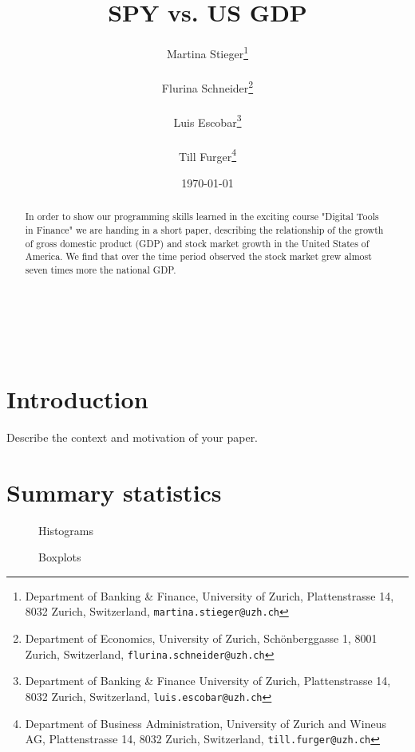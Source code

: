 \documentclass{article}
\title{SPY vs. US GDP}
\author{
    
    Martina Stieger\thanks{Department of Banking \& Finance, University of Zurich, Plattenstrasse 14, 8032 Zurich, Switzerland, \tt{martina.stieger@uzh.ch}} \rule{0.5in}{0pt}

    Flurina Schneider\thanks{Department of Economics, University of Zurich, Schönberggasse 1, 8001 Zurich, Switzerland, \tt{flurina.schneider@uzh.ch}} \rule{0.5in}{0pt}
        
    Luis Escobar\thanks{Department of Banking \& Finance University of Zurich, Plattenstrasse 14, 8032 Zurich, Switzerland, \tt{luis.escobar@uzh.ch}} \rule{0.5in}{0pt}
    
    Till Furger\thanks{Department of Business Administration, University of Zurich and Wineus AG, Plattenstrasse 14, 8032 Zurich, Switzerland, \tt{till.furger@uzh.ch}}\\
    
    \small \date{\today}
}
\begin{document}

\maketitle

\begin{abstract} 
\noindent In order to show our programming skills learned in the exciting course "Digital Tools in Finance" we are
	handing in a short paper, describing the relationship of the growth of gross domestic product (GDP) and stock
	market growth in the United States of America. We find that over the time period observed the stock market grew
	almost seven times more the national GDP.
\end{abstract}

\hfill

\noindent{}\\
\noindent{}\\

\newpage


\tableofcontents
\listoffigures
\listoftables

\section{Introduction}
Describe the context and motivation of your paper.

\section{Summary statistics}

\begin{figure}[htbp]
	\centering
	
	\caption{Histograms}
\end{figure}

\begin{figure}[htbp]
	\centering
	
	\caption{Boxplots}
\end{figure}
\end{document}
